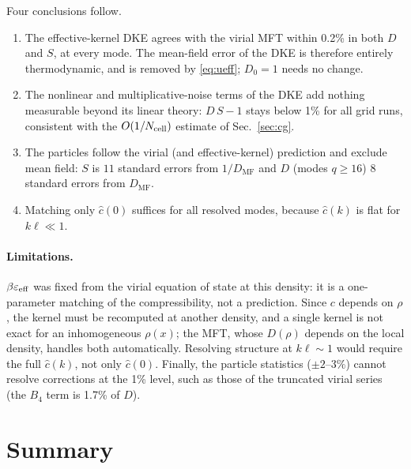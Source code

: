 \documentclass[11pt]{article}
\newcommand{\MF}{\mathrm{MF}}
\begin{document}
\noindent Four conclusions follow.
\begin{enumerate}[nosep]
  \item The effective-kernel DKE agrees with the virial MFT within 0.2\% in
        both $D$ and $S$, at every mode. The mean-field error of the DKE is
        therefore entirely thermodynamic, and is removed by \eqref{eq:ueff};
        $D_0=1$ needs no change.
  \item The nonlinear and multiplicative-noise terms of the DKE add nothing
        measurable beyond its linear theory: $D\,S-1$ stays below 1\% for all
        grid runs, consistent with the $O(1/N_{\rm cell})$ estimate of
        Sec.~\ref{sec:cg}.
  \item The particles follow the virial (and effective-kernel) prediction and
        exclude mean field: $S$ is $11$ standard errors from $1/D_\MF$ and $D$
        (modes $q\ge16$) $8$ standard errors from $D_\MF$.
  \item Matching only $\hat c(0)$ suffices for all resolved modes, because
        $\hat c(k)$ is flat for $k\ell\ll1$.
\end{enumerate}

\paragraph{Limitations.} $\beta\varepsilon_{\rm eff}$ was fixed from the
virial equation of state at this density: it is a one-parameter matching of
the compressibility, not a prediction. Since $c$ depends on $\rho$, the kernel
must be recomputed at another density, and a single kernel is not exact for an
inhomogeneous $\rho(x)$; the MFT, whose $D(\rho)$ depends on the local
density, handles both automatically. Resolving structure at $k\ell\sim1$
would require the full $\hat c(k)$, not only $\hat c(0)$. Finally, the
particle statistics ($\pm2$--$3\%$) cannot resolve corrections at the 1\%
level, such as those of the truncated virial series (the $B_4$ term is 1.7\%
of $D$).

\section{Summary}
\end{document}
